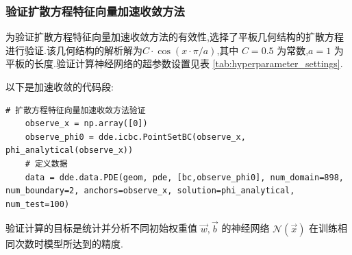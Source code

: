 \documentclass{Sichuan Normal University}
\begin{document}


\subsubsection{验证扩散方程特征向量加速收敛方法}

为验证扩散方程特征向量加速收敛方法的有效性,选择了平板几何结构的扩散方程进行验证.该几何结构的解析解为$C\cdot\cos(x\cdot\pi/a)$,其中 $C=0.5$ 为常数,$a=1$ 为平板的长度.验证计算神经网络的超参数设置见表 \ref{tab:hyperparameter_settings}.

\noindent 以下是加速收敛的代码段:
\begin{lstlisting}[style=python,basicstyle=\footnotesize\fontspec{Courier New},]  
    # 扩散方程特征向量加速收敛方法验证
    observe_x = np.array([0])
    observe_phi0 = dde.icbc.PointSetBC(observe_x, phi_analytical(observe_x))
    # 定义数据
    data = dde.data.PDE(geom, pde, [bc,observe_phi0], num_domain=898, num_boundary=2, anchors=observe_x, solution=phi_analytical, num_test=100)
\end{lstlisting}
验证计算的目标是统计并分析不同初始权重值 ${\vec{w}, \vec{b}}$ 的神经网络 $\mathcal{N}(\vec{x})$ 在训练相同次数时模型所达到的精度.
\end{document}
